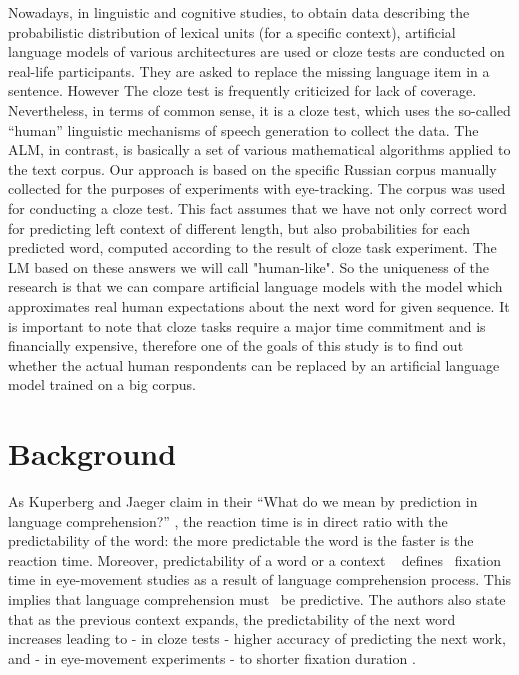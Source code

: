 \documentclass[a4paper]{article}
\begin{document}
Nowadays, in linguistic and cognitive studies, to obtain data describing the probabilistic distribution of lexical units (for a specific context), artificial language models of various architectures are used or cloze tests are conducted on real-life participants. They are asked to replace the missing language item in a sentence. However The cloze test is frequently criticized for lack of coverage. Nevertheless, in terms of common sense, it is a cloze test, which uses the so-called “human” linguistic mechanisms of speech generation to collect the data. The ALM, in contrast, is basically a set of various mathematical algorithms applied to the text corpus.
Our approach is based on the specific Russian corpus manually collected for the purposes of experiments with eye-tracking. The corpus was used for conducting a cloze test. This fact assumes that we have not only correct word for predicting left context of different length, but also probabilities for each predicted word, computed according to the result of cloze task experiment. The LM based on these answers we will call "human-like". So the uniqueness of the research is that we can compare artificial language models with the model which approximates real human expectations about the next word for given sequence.
It is important to note that cloze tasks require a major time commitment and is financially expensive, therefore one of the goals of this study is to find out whether the actual human respondents can be replaced by an artificial language model trained on a big corpus.

\section{Background}


As Kuperberg and Jaeger claim in their “What do we mean by prediction
in language comprehension?” \cite{kuperberg-jaeger}, the reaction time is in direct ratio with the predictability of the word: the more predictable the word is the faster is the reaction time. Moreover, predictability of a word or a context
  defines
 fixation time in eye-movement studies as a result of language comprehension process. This implies that language comprehension must
 be predictive. The authors also state that as the previous context expands, the predictability of the next word increases leading to - in cloze tests - higher accuracy of predicting the next work, and - in eye-movement experiments - to shorter fixation duration
. 
\end{document}
